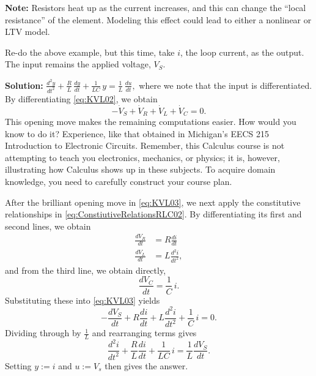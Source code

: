 \vspace*{.2cm} 

\textbf{Note:} Resistors heat up as the current increases, and this can change the ``local resistance'' of the element. Modeling this effect could lead to either a nonlinear or LTV model.
\Qed

\vspace*{.2cm} 

\begin{example} Re-do the above example, but this time, take $i$, the loop current, as the output. The input remains the applied voltage, $V_S$.   
\end{example}
\textbf{Solution:} \Ans  $ \frac{d^2y}{dt^2} +  \frac{R}{L}\,  \frac{dy}{dt}  + \frac{1}{LC}\, y  = \frac{1}{L}\, \frac{du}{dt},$ where we note that the input is differentiated. \\

By differentiating \eqref{eq:KVL02}, we obtain
\begin{equation}
\label{eq:KVL03}
    -\dot{V}_S + \dot{V}_R + \dot{V}_L + \dot{V}_C = 0.
\end{equation}
This opening move makes the remaining computations easier. How would you know to do it? Experience, like that obtained in Michigan's EECS 215 Introduction to Electronic Circuits. Remember, this Calculus course is not attempting to teach you electronics, mechanics, or physics; it is, however, illustrating how Calculus shows up in these subjects. To acquire domain knowledge, you need to carefully construct your course plan.

After the brilliant opening move in \eqref{eq:KVL03}, we next apply the constitutive relationships in \eqref{eq:ConstiutiveRelationsRLC02}. By differentiating its first and second lines, we obtain
\begin{equation}
    \begin{aligned}
        \frac{dV_R}{dt} &= R \frac{di}{dt}  \\
        \frac{dV_L}{dt} &= L \frac{d^2i}{dt^2},
    \end{aligned}
\end{equation}
and from the third line, we obtain directly,
\begin{equation}
    \frac{dV_C}{dt} = \frac{1}{C} \, i.
\end{equation}
Substituting these into \eqref{eq:KVL03} yields
\begin{equation}
\label{eq:KVL04}
    -\frac{dV_S}{dt} + R \frac{di}{dt} + L \frac{d^2i}{dt^2} + \frac{1}{C} \, i = 0.
\end{equation}
Dividing through by $\frac{1}{L}$ and rearranging terms gives
\begin{equation}
\label{eq:KVL05}
    \frac{d^2i}{dt^2} + \frac{R}{L} \frac{di}{dt} + \frac{1}{LC} \, i = \frac{1}{L} \frac{dV_S}{dt}.
\end{equation}
Setting $y:=i$ and $u:=V_s$ then gives the answer. 
\Qed


